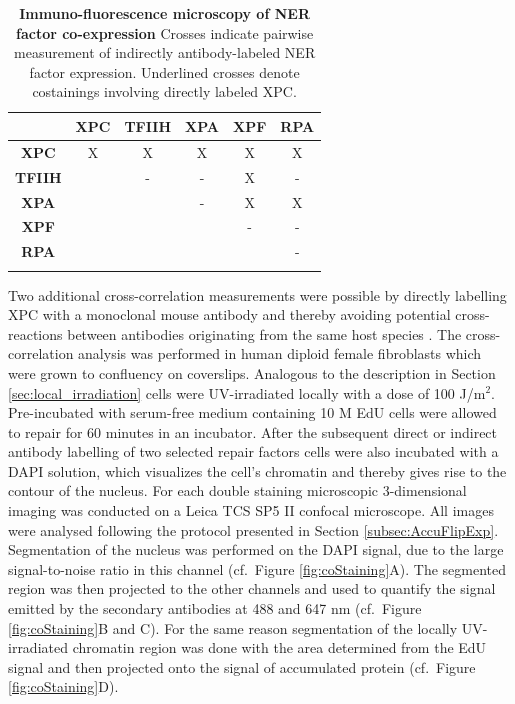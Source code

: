 \begin{table}[h!]
	\centering
	\begin{tabular}{cccccc}
		\hline
			\rule{0pt}{2ex}
			&\textbf{XPC} & \textbf{TFIIH} & \textbf{XPA} & \textbf{XPF} & \textbf{RPA}\\ \hline
			\rule{0pt}{3ex}
\textbf{XPC}&        X    &           X    & X            &         X    & X            \\ \hline
			\rule{0pt}{3ex}
\textbf{TFIIH}&           & -              & -            & X            & -             \\ \hline
			\rule{0pt}{3ex}
\textbf{XPA}&             &                & -            & X            & X             \\ \hline
			\rule{0pt}{3ex}
\textbf{XPF}&             &                &              & -            & -              \\ \hline
			\rule{0pt}{3ex}
\textbf{RPA}&             &                &              &              & -               \\ \hline
			\rule{0pt}{3ex}
		
	\end{tabular}
	\caption{\textbf{Immuno-fluorescence microscopy of NER factor co-expression} Crosses indicate pairwise measurement of indirectly antibody-labeled NER factor expression. Underlined crosses denote costainings involving directly labeled XPC. }\label{tab:co-staining}
\end{table}   


Two additional cross-correlation measurements were possible by directly labelling XPC with a monoclonal mouse antibody and thereby avoiding potential cross-reactions between antibodies originating from the same host species \cite{Burry2011,Giepmans2006}. The cross-correlation analysis was performed in human diploid female fibroblasts which were grown to confluency on coverslips. Analogous to the description in Section \ref{sec:local_irradiation} cells were UV-irradiated locally with a dose of 100 J/$\text{m}^\text{2}$. Pre-incubated with serum-free medium containing 10 \textmu M EdU cells were allowed to repair for 60 minutes in an incubator. After the subsequent direct or indirect antibody labelling of two selected repair factors cells were also incubated with a DAPI solution, which visualizes the cell's chromatin and thereby gives rise to the contour of the nucleus. For each double staining microscopic 3-dimensional imaging was conducted on a Leica TCS SP5 II confocal microscope. All images were analysed following the protocol presented in Section \ref{subsec:AccuFlipExp}. Segmentation of the nucleus was performed on the DAPI signal, due to the large signal-to-noise ratio in this channel (cf.\ Figure \ref{fig:coStaining}A). The segmented region was then projected to the other channels and used to quantify the signal emitted by the secondary antibodies at 488 and 647 nm (cf.\ Figure \ref{fig:coStaining}B and C). For the same reason segmentation of the locally UV-irradiated chromatin region was done with the area determined from the EdU signal and then projected onto the signal of accumulated protein (cf.\ Figure \ref{fig:coStaining}D).   

